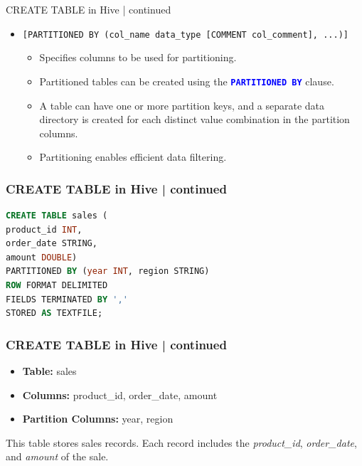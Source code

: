   \begin{frame}{CREATE TABLE in Hive | continued}
	\begin{tcolorbox}[colback=white,colframe=black,title= Part 8: Table Partitions]
		\small
	\begin{itemize}
	  \item \texttt{[PARTITIONED BY (col\_name data\_type [COMMENT col\_comment], ...)]}
	  \begin{itemize}
		\item Specifies columns to be used for partitioning.
		\vspace{-0.2cm}\item Partitioned tables can be created using the \textcolor{blue}{\textbf{\texttt{PARTITIONED BY}}} clause.
		\vspace{-0.2cm}\item A table can have one or more partition keys, and a separate data directory is created for each distinct value combination in the partition columns.
		\vspace{-0.2cm}\item Partitioning enables efficient data filtering.
		
	  \end{itemize}
	\end{itemize}
	\end{tcolorbox}
  \end{frame}
  \begin{frame}[fragile]
	\frametitle{CREATE TABLE in Hive | continued}
	\begin{tcolorbox}[colback=white,colframe=black,title= Part 8: Table Partitions]
		\small
\begin{lstlisting}[caption={Create Partitioned Table},language=SQL]
CREATE TABLE sales (
product_id INT,
order_date STRING,
amount DOUBLE)
PARTITIONED BY (year INT, region STRING)
ROW FORMAT DELIMITED
FIELDS TERMINATED BY ','
STORED AS TEXTFILE;
\end{lstlisting}
\end{tcolorbox}

\end{frame}
	\begin{frame}[fragile]
	\frametitle{CREATE TABLE in Hive | continued}
	\begin{tcolorbox}[colback=white,colframe=black,title= Part 8: Table Partitions]
		\small

	\begin{itemize}
	\item \textbf{Table:} sales
	\item \textbf{Columns:} product_id, order_date, amount
	\item \textbf{Partition Columns:} year, region
	\end{itemize}
	This table stores sales records. Each record includes the \textit{product\_id}, \textit{order\_date}, and \textit{amount} of the sale.
\end{tcolorbox}
	
\end{frame}
